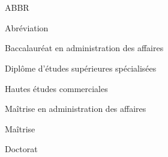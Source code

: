 \chapter*{\HECtdmAbreviations}

\begin{HECabreviations}{ABBR}
\item[ABBR] Abréviation
\item[BAA] Baccalauréat en administration des affaires
\item[DESS] Diplôme d'études supérieures spécialisées
\item[HEC] Hautes études commerciales
\item[MBA] Maîtrise en administration des affaires
\item[MSc] Maîtrise
\item[PhD] Doctorat
\end{HECabreviations}

